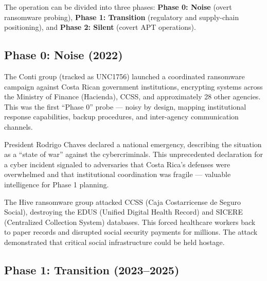 \documentclass[11pt,a4paper]{article}
\begin{document}
The operation can be divided into three phases: \textbf{Phase 0: Noise} (overt ransomware probing), \textbf{Phase 1: Transition} (regulatory and supply-chain positioning), and \textbf{Phase 2: Silent} (covert APT operations).

\subsection{Phase 0: Noise (2022)}

\begin{description}[style=nextline, leftmargin=1.5cm]

\item[\textcolor{phase0}{2022-04-17} --- Conti Ransomware (UNC1756)]
The Conti group (tracked as UNC1756) launched a coordinated ransomware campaign against Costa Rican government institutions, encrypting systems across the Ministry of Finance (Hacienda), CCSS, and approximately 28 other agencies. This was the first ``Phase 0'' probe --- noisy by design, mapping institutional response capabilities, backup procedures, and inter-agency communication channels.

\item[\textcolor{phase0}{2022-05-08} --- National Emergency Declaration]
President Rodrigo Chaves declared a national emergency, describing the situation as a ``state of war'' against the cybercriminals. This unprecedented declaration for a cyber incident signaled to adversaries that Costa Rica's defenses were overwhelmed and that institutional coordination was fragile --- valuable intelligence for Phase 1 planning.

\item[\textcolor{phase0}{2022-05-31} --- Hive Ransomware Targets CCSS]
The Hive ransomware group attacked CCSS (Caja Costarricense de Seguro Social), destroying the EDUS (Unified Digital Health Record) and SICERE (Centralized Collection System) databases. This forced healthcare workers back to paper records and disrupted social security payments for millions. The attack demonstrated that critical social infrastructure could be held hostage.

\end{description}

\subsection{Phase 1: Transition (2023--2025)}
\end{document}
